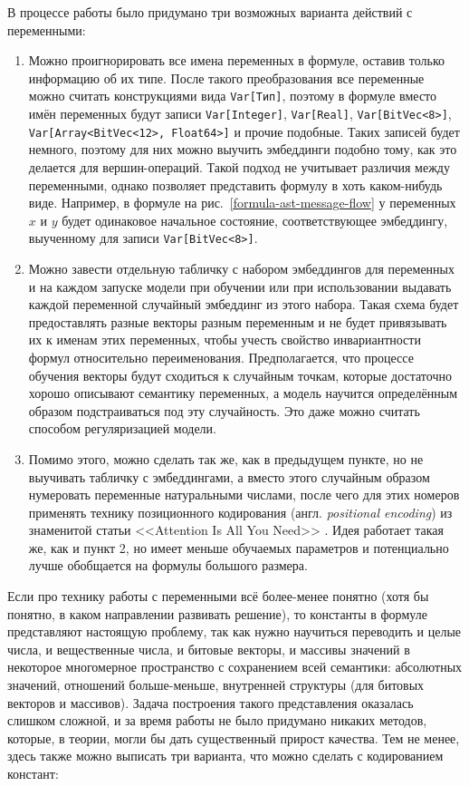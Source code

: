 В процессе работы было придумано три возможных варианта действий с переменными:

\begin{enumerate}
    \item Можно проигнорировать все имена переменных в формуле, оставив только информацию об их типе. После такого преобразования все переменные можно считать конструкциями вида \texttt{Var[Тип]}, поэтому в формуле вместо имён переменных будут записи \texttt{Var[Integer]}, \texttt{Var[Real]}, \texttt{Var[BitVec<8>]}, \texttt{Var[Array<BitVec<12>, Float64>]} и прочие подобные. Таких записей будет немного, поэтому для них можно выучить эмбеддинги подобно тому, как это делается для вершин-операций. Такой подход не учитывает различия между переменными, однако позволяет представить формулу в хоть каком-нибудь виде. Например, в формуле на рис.~\ref{formula-ast-message-flow} у переменных $x$ и $y$ будет одинаковое начальное состояние, соответствующее эмбеддингу, выученному для записи \texttt{Var[BitVec<8>]}.
    \item Можно завести отдельную табличку с набором эмбеддингов для переменных и на каждом запуске модели при обучении или при использовании выдавать каждой переменной случайный эмбеддинг из этого набора. Такая схема будет предоставлять разные векторы разным переменным и не будет привязывать их к именам этих переменных, чтобы учесть свойство инвариантности формул относительно переименования. Предполагается, что процессе обучения векторы будут сходиться к случайным точкам, которые достаточно хорошо описывают семантику переменных, а модель научится определённым образом подстраиваться под эту случайность. Это даже можно считать способом регуляризацией модели.
    \item Помимо этого, можно сделать так же, как в предыдущем пункте, но не выучивать табличку с эмбеддингами, а вместо этого случайным образом нумеровать переменные натуральными числами, после чего для этих номеров применять технику позиционного кодирования (англ. \textit{positional encoding}) из знаменитой статьи <<Attention Is All You Need>> \cite{attention-is-all-you-need}. Идея работает такая же, как и пункт 2, но имеет меньше обучаемых параметров и потенциально лучше обобщается на формулы большого размера.
\end{enumerate}

Если про технику работы с переменными всё более-менее понятно (хотя бы понятно, в каком направлении развивать решение), то константы в формуле представляют настоящую проблему, так как нужно научиться переводить и целые числа, и вещественные числа, и битовые векторы, и массивы значений в некоторое многомерное пространство с сохранением всей семантики: абсолютных значений, отношений больше-меньше, внутренней структуры (для битовых векторов и массивов). Задача построения такого представления оказалась слишком сложной, и за время работы не было придумано никаких методов, которые, в теории, могли бы дать существенный прирост качества. Тем не менее, здесь также можно выписать три варианта, что можно сделать с кодированием констант:

